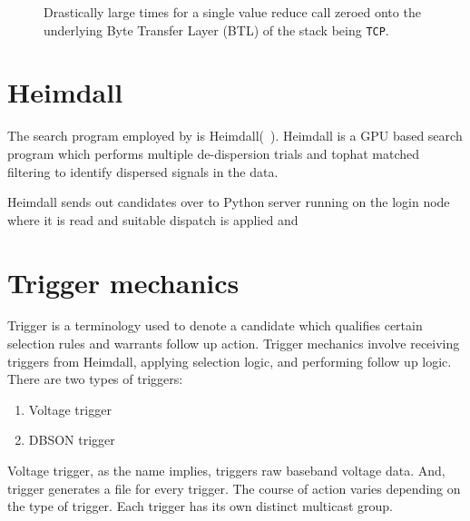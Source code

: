 \begin{figure}
	\label{fig:tcpreduce}
	\caption{Drastically large times for a single value \mpi reduce call zeroed onto the underlying Byte Transfer Layer (BTL) of the \mpi stack being \texttt{TCP}.}
\end{figure}




\section {Heimdall}

\par The search program employed by \vf is Heimdall(~\cite{heimdall}). 
Heimdall is a GPU based search program which performs multiple de-dispersion trials and tophat matched filtering to identify dispersed signals in the data.

\begin{algorithm}
\end{algorithm}

\par Heimdall sends out candidates over to Python server running on the login node where it is read and suitable dispatch is applied and 


\section {Trigger mechanics}
\label{sec:tmech}

\par Trigger is a terminology used to denote a candidate which qualifies certain selection rules and warrants follow up action. Trigger mechanics involve receiving triggers from Heimdall, applying selection logic, and performing follow up logic. 
There are two types of triggers: 
\begin{enumerate}
	\item Voltage trigger
	\item DBSON trigger
\end{enumerate}
Voltage trigger, as the name implies, triggers raw baseband voltage data. And, \dbson trigger generates a \dbson file for every trigger. The course of action varies depending on the type of trigger. Each trigger has its own distinct multicast group.

